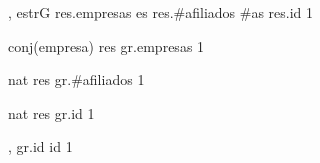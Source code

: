 {, }{estrG}
{
	\state res.empresas \asig es 							
	\state res.\#afiliados \asig \#as 						
	\state res.id  									
}
{1}
{}

{}{conj(empresa)}
{
	\state res \asig gr.empresas 							
}
{1}
{}

{}{nat}
{
	\state res \asig gr.\#afiliados 						
}
{1}
{}

{}{nat}
{
	\state res \asig gr.id 									
}
{1}
{}

{, }{}
{
	\state gr.id \asig id 									
}
{1}
{}